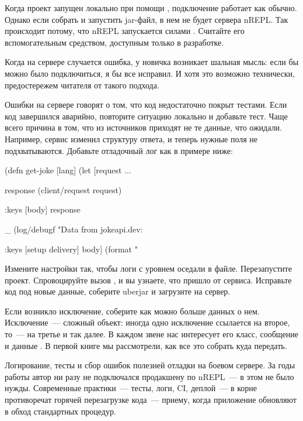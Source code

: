 Когда проект запущен локально при помощи , подключение работает как обычно. Однако если собрать и запустить jar-файл, в нем не будет сервера nREPL. Так происходит потому, что nREPL запускается силами . Считайте его вспомогательным средством, доступным только в разработке.

Когда на сервере случается ошибка, у новичка возникает шальная мысль: если бы можно было подключиться, я бы все исправил. И хотя это возможно технически, предостережем читателя от такого подхода.

Ошибки на сервере говорят о том, что код недостаточно покрыт тестами. Если код завершился аварийно, повторите ситуацию локально и добавьте тест. Чаще всего причина в том, что из источников приходят не те данные, что ожидали. Например, сервис  изменил структуру ответа, и теперь нужные поля не подхватываются. Добавьте отладочный лог как в примере ниже:

\begin{english}
  \begin{clojure}
(defn get-joke [lang]
  (let [request
        {...}

        response
        (client/request request)

        {:keys [body]}
        response

        _ (log/debugf "Data from jokeapi.dev: %

        {:keys [setup delivery]}
        body]
    (format "%
  \end{clojure}
\end{english}

Измените настройки так, чтобы логи с уровнем  оседали в файле. Перезапустите проект. Спровоцируйте вызов , и вы узнаете, что пришло от сервиса. Исправьте код под новые данные, соберите uberjar и загрузите на сервер.

Если возникло исключение, соберите как можно больше данных о нем. Исключение~--- сложный объект: иногда одно исключение ссылается на второе, то~--- на третье и так далее. В каждом звене нас интересует его класс, сообщение и данные . В первой книге мы рассмотрели, как все это собрать куда передать.

Логирование, тесты и сбор ошибок полезней отладки на боевом сервере. За годы работы автор ни разу не подключался продакшену по nREPL~--- в этом не было нужды. Современные практики~--- тесты, логи, CI, деплой~--- в корне противоречат горячей перезагрузке кода~--- приему, когда приложение обновляют в обход стандартных процедур.

